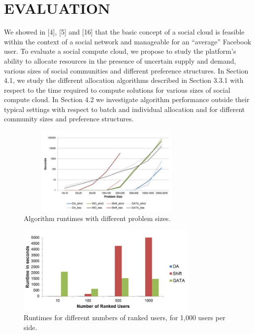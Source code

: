 \documentclass[a4paper,12pt]{article}
\begin{document}
	\section{EVALUATION}
We showed in [4], [5] and [16] that the basic concept of a
social cloud is feasible within the context of a social network
and manageable for an “average” Facebook user. To evaluate
a social compute cloud, we propose to study the platform’s
ability to allocate resources in the presence of uncertain supply and demand, various sizes of social communities and different preference structures. In Section 4.1, we study the
different allocation algorithms described in Section 3.3.1
with respect to the time required to compute solutions for
various sizes of social compute cloud. In Section 4.2 we
investigate algorithm performance outside their typical settings with respect to batch and individual allocation and for
different community sizes and preference structures.
            \begin{figure}[htp]
                \begin{center}
                    \includegraphics[height=1.7in,width=3.5in]{jpg/fig4.JPG}
                \end{center}
                \caption{Algorithm runtimes with different problem sizes.} \label{Fig:4}
            \end{figure}
            \begin{figure}[htp]
                \begin{center}
                    \includegraphics[height=1.7in,width=3.5in]{jpg/fig5.JPG}
                \end{center}
                \caption{Runtimes for different numbers of ranked users, for 1,000 users
per side.} \label{Fig:5}
            \end{figure}
\end{document}
